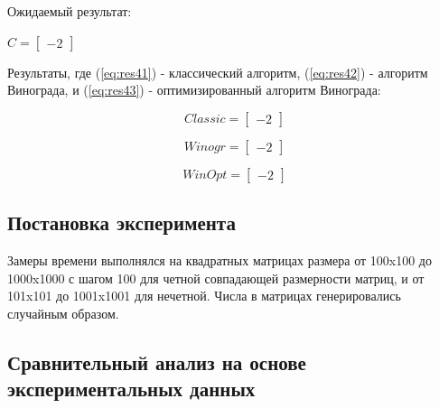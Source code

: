 \documentclass[12pt,a4paper]{scrartcl}
\begin{document}
Ожидаемый результат:

\begin{center}
		\begin{math}\label{eq:res4}
		C =\begin{bmatrix}
		-2 
		\end{bmatrix}
		\end{math}
\end{center}

Результаты, где (\ref{eq:res41}) - классический алгоритм, (\ref{eq:res42}) - алгоритм Винограда, и (\ref{eq:res43}) - оптимизированный алгоритм Винограда:

\begin{center}
	\begin{minipage}[c][3cm][c]{0,3\textwidth}
		\begin{equation}\label{eq:res41}
		Classic =\begin{bmatrix}
		-2 
		\end{bmatrix}
		\end{equation}
	\end{minipage}	
	\begin{minipage}[c][3cm][c]{0,3\textwidth}
		\begin{equation}\label{eq:res42}
		Winogr =\begin{bmatrix}
		-2 
		\end{bmatrix}
		\end{equation}
	\end{minipage}	
	\begin{minipage}[c][3cm][c]{0,3\textwidth}
		\begin{equation}\label{eq:res43}
		WinOpt =\begin{bmatrix}
		-2
		\end{bmatrix}
		\end{equation}
	\end{minipage}
\end{center}

\newpage
\subsection{Постановка эксперимента}
\label{sec:exp:setting}
Замеры времени выполнялся на квадратных матрицах размера от 100x100 до 1000x1000 с шагом 100 для четной совпадающей размерности матриц, и от 101x101 до 1001x1001 для нечетной. 
Числа в матрицах генерировались случайным образом. 

\newpage
\subsection{Сравнительный анализ на основе экспериментальных данных}
\label{sec:exp:compare}
\end{document}
